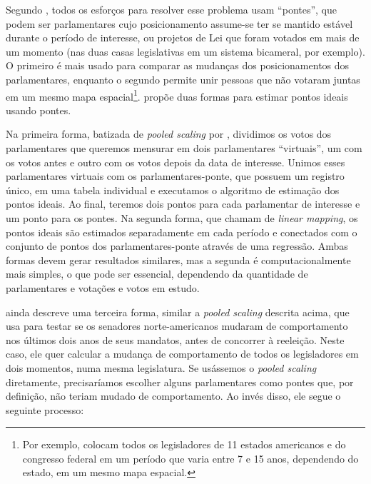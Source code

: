\documentclass[a4paper,titlepage]{ppgi}\usepackage[]{graphicx}\usepackage[]{color}
\begin{document}
Segundo , todos os esforços para resolver esse problema
usam ``pontes'', que podem ser parlamentares cujo posicionamento assume-se ter
se mantido estável durante o período de interesse, ou projetos de Lei que
foram votados em mais de um momento (nas duas casas legislativas em um sistema
bicameral, por exemplo). O primeiro é mais usado para comparar as mudanças dos
posicionamentos dos parlamentares, enquanto o segundo permite unir pessoas que
não votaram juntas em um mesmo mapa espacial\footnote{Por exemplo,
 colocam todos os legisladores de 11 estados americanos e
do congresso federal em um período que varia entre 7 e 15 anos, dependendo do
estado, em um mesmo mapa espacial.}.  propõe duas formas
para estimar pontos ideais usando pontes.

Na primeira forma, batizada de \emph{pooled scaling} por ,
dividimos os votos dos parlamentares que queremos mensurar em dois
parlamentares ``virtuais'', um com os votos antes e outro com os votos depois
da data de interesse. Unimos esses parlamentares virtuais com os
parlamentares-ponte, que possuem um registro único, em uma tabela individual e
executamos o algoritmo de estimação dos pontos ideais. Ao final, teremos dois
pontos para cada parlamentar de interesse e um ponto para os pontes. Na
segunda forma, que  chamam de \emph{linear mapping},
os pontos ideais são estimados separadamente em cada período e conectados com
o conjunto de pontos dos parlamentares-ponte através de uma regressão.
Ambas formas devem gerar resultados similares, mas a segunda é
computacionalmente mais simples, o que pode ser essencial, dependendo da
quantidade de parlamentares e votações e votos em estudo.

 ainda descreve uma terceira forma, similar a
\emph{pooled scaling} descrita acima, que usa para testar se os senadores
norte-americanos mudaram de comportamento nos últimos dois anos de seus
mandatos, antes de concorrer à reeleição. Neste caso, ele quer calcular a
mudança de comportamento de todos os legisladores em dois momentos, numa mesma
legislatura. Se usássemos o \emph{pooled scaling} diretamente, precisaríamos
escolher alguns parlamentares como pontes que, por definição, não teriam mudado
de comportamento. Ao invés disso, ele segue o seguinte processo:
\end{document}

